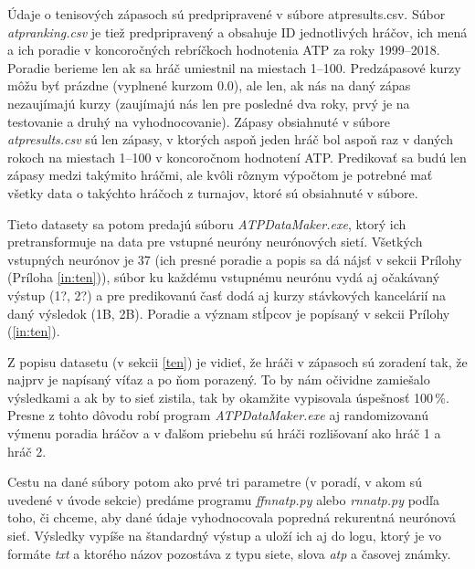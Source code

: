 Údaje o tenisových zápasoch sú predpripravené v súbore atpresults.csv.
Súbor \textit{atpranking.csv} je tiež predpripravený a obsahuje ID jednotlivých hráčov, ich mená a ich poradie v koncoročných rebríčkoch hodnotenia ATP za roky 1999--2018.
Poradie berieme len ak sa hráč umiestnil na miestach 1--100.
Predzápasové kurzy môžu byť prázdne (vyplnené kurzom 0.0), ale len, ak nás na daný zápas nezaujímajú kurzy (zaujímajú nás len pre posledné dva roky, prvý je na testovanie a druhý na vyhodnocovanie). 
Zápasy obsiahnuté v súbore \textit{atpresults.csv} sú len zápasy, v ktorých aspoň jeden hráč bol aspoň raz v daných rokoch na miestach 1--100 v koncoročnom hodnotení ATP.
Predikovať sa budú len zápasy medzi takýmito hráčmi, ale kvôli rôznym výpočtom je potrebné mať všetky data o takýchto hráčoch z turnajov, ktoré sú obsiahnuté v súbore.

Tieto datasety sa potom predajú súboru \textit{ATPDataMaker.exe}, ktorý ich pretransformuje na data pre vstupné neuróny neurónových sietí. Všetkých vstupných neurónov je 37 (ich presné poradie a popis sa dá nájsť v sekcii Prílohy (Príloha \ref{in:ten})), súbor ku každému vstupnému neurónu vydá aj očakávaný výstup (1?, 2?) a pre predikovanú časť dodá aj kurzy stávkových kancelárií na daný výsledok (1B, 2B).
Poradie a význam stĺpcov je popísaný v sekcii Prílohy (\ref{in:ten}).

Z popisu datasetu (v sekcii \ref{ten}) je vidieť, že hráči v zápasoch sú zoradení tak, že najprv je napísaný víťaz a po ňom porazený. To by nám očividne zamiešalo výsledkami a ak by to sieť zistila, tak by okamžite vypisovala úspešnosť 100\,\%.
Presne z tohto dôvodu robí program \textit{ATPDataMaker.exe} aj randomizovanú výmenu poradia hráčov a v ďalšom priebehu sú hráči rozlišovaní ako hráč 1 a hráč 2.

Cestu na dané súbory potom ako prvé tri parametre (v poradí, v akom sú uvedené v úvode sekcie) predáme programu \textit{ffnnatp.py} alebo \textit{rnnatp.py} podľa toho, či chceme, aby dané údaje vyhodnocovala popredná rekurentná neurónová sieť.
Výsledky vypíše na štandardný výstup a uloží ich aj do logu, ktorý je vo formáte \textit{txt} a ktorého názov pozostáva z typu siete, slova \textit{atp} a časovej známky.

